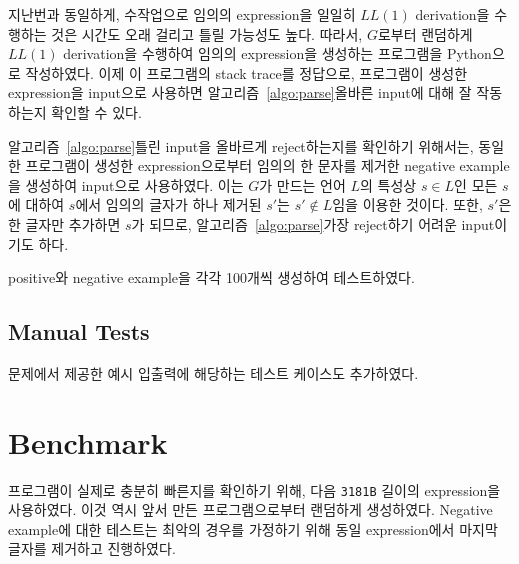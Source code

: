 \documentclass[a4paper,10pt]{scrartcl}
\numberwithin{equation}{section}
\numberwithin{figure}{section}
\numberwithin{table}{section}
\theoremstyle{definition}
\begin{document}
지난번과 동일하게, 수작업으로 임의의 expression을 일일히 $LL(1)$ derivation을 수행하는 것은 시간도 오래 걸리고 틀릴 가능성도 높다. 따라서, $G$로부터 랜덤하게 $LL(1)$ derivation을 수행하여 임의의 expression을 생성하는 프로그램을 Python으로 작성하였다. 이제 이 프로그램의 stack trace를 정답으로, 프로그램이 생성한 expression을 input으로 사용하면 알고리즘~\ref{algo:parse}\가 올바른 input에 대해 잘 작동하는지 확인할 수 있다.

알고리즘~\ref{algo:parse}\가 틀린 input을 올바르게 reject하는지를 확인하기 위해서는, 동일한 프로그램이 생성한 expression으로부터 임의의 한 문자를 제거한 negative example을 생성하여 input으로 사용하였다. 이는 $G$가 만드는 언어 $L$의 특성상 $s \in L$인 모든 $s$에 대하여 $s$에서 임의의 글자가 하나 제거된 $s'$는 $s' \notin L$임을 이용한 것이다. 또한, $s'$은 한 글자만 추가하면 $s$가 되므로, 알고리즘~\ref{algo:parse}\가 가장 reject하기 어려운 input이기도 하다.

positive와 negative example을 각각 100개씩 생성하여 테스트하였다.

\subsection{Manual Tests}

문제에서 제공한 예시 입출력에 해당하는 테스트 케이스도 추가하였다.

\section{Benchmark}

프로그램이 실제로 충분히 빠른지를 확인하기 위해, 다음 \lstinline{3181B} 길이의 expression을 사용하였다. 이것 역시 앞서 만든 프로그램으로부터 랜덤하게 생성하였다. Negative example에 대한 테스트는 최악의 경우를 가정하기 위해 동일 expression에서 마지막 글자를 제거하고 진행하였다.
\end{document}

